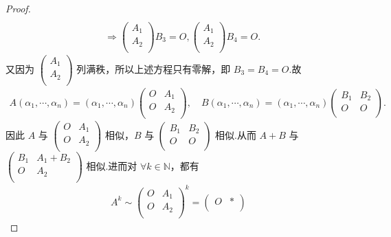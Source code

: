 \documentclass[../../main.tex]{subfiles}
\begin{document}
\begin{proof}
\begin{align*}
\\
&\Longrightarrow \begin{pmatrix}
A_1\\
A_2\\
\end{pmatrix} B_3=O,\begin{pmatrix}
A_1\\
A_2\\
\end{pmatrix} B_4=O.
\end{align*}
又因为 $\begin{pmatrix}
A_1\\
A_2\\
\end{pmatrix}$ 列满秩，所以上述方程只有零解，即 $B_3=B_4=O$.故
\begin{align*}
A\left( \alpha _1,\cdots ,\alpha _n \right) =\left( \alpha _1,\cdots ,\alpha _n \right) \begin{pmatrix}
O&		A_1\\
O&		A_2\\
\end{pmatrix}, \quad B\left( \alpha _1,\cdots ,\alpha _n \right) =\left( \alpha _1,\cdots ,\alpha _n \right) \begin{pmatrix}
B_1&		B_2\\
O&		O\\
\end{pmatrix}.
\end{align*}
因此 $A$ 与 $\begin{pmatrix}
O&		A_1\\
O&		A_2\\
\end{pmatrix}$ 相似，$B$ 与 $\begin{pmatrix}
B_1&		B_2\\
O&		O\\
\end{pmatrix}$ 相似.从而 $A+B$ 与 $\begin{pmatrix}
B_1&		A_1+B_2\\
O&		A_2\\
\end{pmatrix}$ 相似.进而对 $\forall k\in \mathbb{N}$，都有
\begin{align*}
A^k\sim \begin{pmatrix}
O&		A_1\\
O&		A_2\\
\end{pmatrix} ^k=\begin{pmatrix}
O&		*\\

\end{pmatrix}
\end{align*}
\end{proof}
\end{document}
